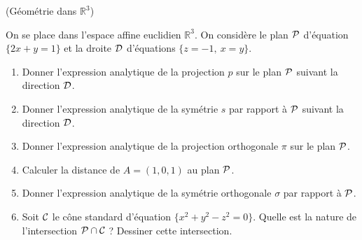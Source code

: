 \documentclass[a4paper,12pt,reqno]{amsart}
\begin{document}
\begin{exo} (Géométrie dans $\mathbb{R}^{3}$)

  On se place dans l'espace affine euclidien $\mathbb{R}^{3}$. On considère le plan $\mathcal{P}$ d'équation $\{2x+y=1\}$ et la droite $\mathcal{D}$ d'équations $\{z=-1,\ x=y\}$.

  \begin{enumerate}

    \item Donner l'expression analytique de la projection $p$ sur le plan $\mathcal{P}$ suivant la direction $\mathcal{D}$.

    \item Donner l'expression analytique de la symétrie $s$ par rapport à $\mathcal{P}$ suivant la direction $\mathcal{D}$.

    \item Donner l'expression analytique de la projection orthogonale $\pi$ sur le plan $\mathcal{P}$.

    \item Calculer la distance de $A=(1,0,1)$ au plan $\mathcal{P}$.

    \item Donner l'expression analytique de la symétrie orthogonale $\sigma$ par rapport à $\mathcal{P}$.

    \item Soit $\mathcal{C}$ le cône standard d'équation $\{x^{2}+y^{2}-z^{2}=0\}$. Quelle est la nature de l'intersection $\mathcal{P} \cap \mathcal{C}$ ? Dessiner cette intersection.
  \end{enumerate}
\end{exo}
\end{document}
